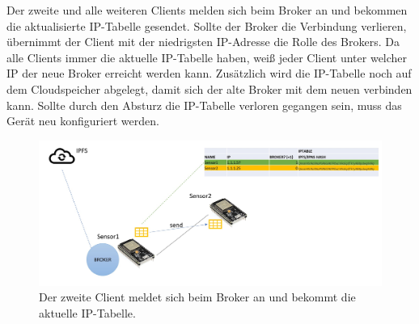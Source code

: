 \documentclass{article}
\begin{document}
Der zweite und alle weiteren Clients melden sich beim Broker an und bekommen die aktualisierte IP-Tabelle gesendet. Sollte der Broker die Verbindung verlieren, übernimmt der Client mit der niedrigsten IP-Adresse die Rolle des Brokers. Da alle Clients immer die aktuelle IP-Tabelle haben, weiß jeder Client unter welcher IP der neue Broker erreicht werden kann. Zusätzlich wird die IP-Tabelle noch auf dem Cloudspeicher abgelegt, damit sich der alte Broker mit dem neuen verbinden kann. Sollte durch den Absturz die IP-Tabelle verloren gegangen sein, muss das Gerät neu konfiguriert werden.

\begin{figure}[h]
    \centering
    \includegraphics[width=1\linewidth]{Porposal/bild2.jpg}
    \caption{Der zweite Client meldet sich beim Broker an und bekommt die aktuelle IP-Tabelle.}
    \label{fig:statemachine}
\end{figure}
\end{document}

